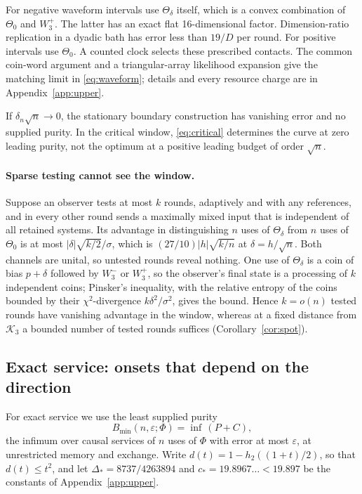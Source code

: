 \documentclass[11pt]{article}
\theoremstyle{definition}
\theoremstyle{remark}
\newcommand{\K}{\mathcal K}
\newcommand{\Wminus}{W_3^-}
\newcommand{\Wplus}{W_3^+}
\newcommand{\eps}{\varepsilon}
\begin{document}
For negative waveform intervals use $\Theta_{\delta}$ itself, which is a convex combination of $\Theta_0$ and $\Wplus$. The latter has an exact flat 16-dimensional factor. Dimension-ratio replication in a dyadic bath has error less than $19/D$ per round. For positive intervals use $\Theta_0$. A counted clock selects these prescribed contacts. The common coin-word argument and a triangular-array likelihood expansion give the matching limit in \eqref{eq:waveform}; details and every resource charge are in Appendix~\ref{app:upper}.

If $\delta_n\sqrt n\to0$, the stationary boundary construction has vanishing error and no supplied purity. In the critical window, \eqref{eq:critical} determines the curve at zero leading purity, not the optimum at a positive leading budget of order $\sqrt n$.

\paragraph{Sparse testing cannot see the window.}
Suppose an observer tests at most $k$ rounds, adaptively and with any references, and in every other round sends a maximally mixed input that is independent of all retained systems. Its advantage in distinguishing $n$ uses of $\Theta_\delta$ from $n$ uses of $\Theta_0$ is at most $|\delta|\sqrt{k/2}/\sigma$, which is $(27/10)|h|\sqrt{k/n}$ at $\delta=h/\sqrt n$. Both channels are unital, so untested rounds reveal nothing. One use of $\Theta_\delta$ is a coin of bias $p+\delta$ followed by $\Wminus$ or $\Wplus$, so the observer's final state is a processing of $k$ independent coins; Pinsker's inequality, with the relative entropy of the coins bounded by their $\chi^2$-divergence $k\delta^2/\sigma^2$, gives the bound. Hence $k=o(n)$ tested rounds have vanishing advantage in the window, whereas at a fixed distance from $\K_3$ a bounded number of tested rounds suffices (Corollary~\ref{cor:spot}).

\subsection{Exact service: onsets that depend on the direction}

For exact service we use the least supplied purity
\[
 B_{\min}(n,\eps;\Phi)=\inf\,(P+C),
\]
the infimum over causal services of $n$ uses of $\Phi$ with error at most $\eps$, at unrestricted memory and exchange. Write $d(t)=1-h_2((1+t)/2)$, so that $d(t)\le t^2$, and let $\Delta_*=8737/4263894$ and $c_*=19.8967\ldots<19.897$ be the constants of Appendix~\ref{app:upper}.
\end{document}
